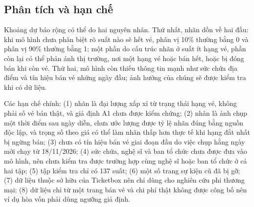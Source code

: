 \documentclass{IEEEtran}
\begin{document}
\subsection{Phân tích và hạn chế}
Khoảng dự báo rộng có thể do hai nguyên nhân. Thứ nhất, nhãn dồn về hai đầu: khi mô hình chưa phân biệt rõ suất nào sẽ hết vé, phân vị 10\% thường bằng 0 và phân vị 90\% thường bằng 1; một phần do cấu trúc nhãn ở suất ít hạng vé, phần còn lại có thể phản ánh thị trường, nơi một hạng vé hoặc bán hết, hoặc bị đóng bán khi còn vé. Thứ hai, mô hình còn thiếu thông tin mạnh như sức chứa địa điểm và tín hiệu bán vé những ngày đầu; ảnh hưởng của chúng sẽ được kiểm tra khi có dữ liệu.

Các hạn chế chính: (1) nhãn là đại lượng xấp xỉ từ trạng thái hạng vé, không phải số vé bán thật, và giả định A1 chưa được kiểm chứng; (2) nhãn là ảnh chụp một thời điểm sau ngày diễn, chưa ước lượng được tỷ lệ nhãn đúng bằng nguồn độc lập, và trọng số theo giá có thể làm nhãn thấp hơn thực tế khi hạng đắt nhất bị ngừng bán; (3) chưa có tín hiệu bán vé giai đoạn đầu do việc chụp hằng ngày mới chạy từ 18/11/2026; (4) sức chứa, nghệ sĩ và ban tổ chức chưa được đưa vào mô hình, nên chưa kiểm tra được trường hợp cùng nghệ sĩ hoặc ban tổ chức ở cả hai tập; (5) tập kiểm tra chỉ có 137 suất; (6) một số trang sự kiện cũ đã bị gỡ; (7) dữ liệu thuộc sở hữu của Ticketbox nên chỉ dùng cho nghiên cứu phi thương mại; (8) dữ liệu chỉ từ một trang bán vé và chi phí thật không được công bố nên ví dụ hòa vốn phải dùng ngưỡng giả định.

\end{document}
